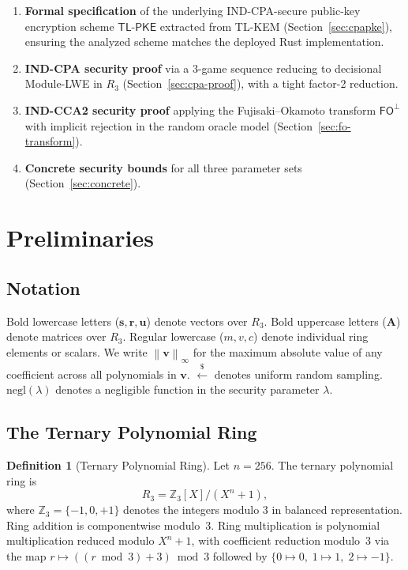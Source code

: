 \documentclass[11pt,a4paper]{article}
\theoremstyle{definition}
\newtheorem{definition}[theorem]{Definition}
\newcommand{\Z}{\mathbb{Z}}
\newcommand{\Rq}{R_3}
\newcommand{\linf}[1]{\left\lVert #1 \right\rVert_{\infty}}
\newcommand{\negl}{\mathrm{negl}}
\newcommand{\FO}{\textsf{FO}}
\newcommand{\CPAPKE}{\textsf{TL-PKE}}
\begin{document}
\begin{enumerate}[leftmargin=2em]
\item \textbf{Formal specification} of the underlying IND-CPA-secure public-key encryption scheme $\CPAPKE$ extracted from TL-KEM (Section~\ref{sec:cpapke}), ensuring the analyzed scheme matches the deployed Rust implementation.

\item \textbf{IND-CPA security proof} via a 3-game sequence reducing to decisional Module-LWE in $\Rq$ (Section~\ref{sec:cpa-proof}), with a tight factor-2 reduction.

\item \textbf{IND-CCA2 security proof} applying the Fujisaki--Okamoto transform $\FO^{\bot}$ with implicit rejection in the random oracle model (Section~\ref{sec:fo-transform}).

\item \textbf{Concrete security bounds} for all three parameter sets (Section~\ref{sec:concrete}).
\end{enumerate}

\section{Preliminaries}
\label{sec:prelim}

\subsection{Notation}

Bold lowercase letters ($\mathbf{s}, \mathbf{r}, \mathbf{u}$) denote vectors over $\Rq$. Bold uppercase letters ($\mathbf{A}$) denote matrices over $\Rq$. Regular lowercase ($m, v, c$) denote individual ring elements or scalars. We write $\linf{\mathbf{v}}$ for the maximum absolute value of any coefficient across all polynomials in $\mathbf{v}$. $\xleftarrow{\$}$ denotes uniform random sampling. $\negl(\lambda)$ denotes a negligible function in the security parameter $\lambda$.

\subsection{The Ternary Polynomial Ring}

\begin{definition}[Ternary Polynomial Ring]
\label{def:ring}
Let $n = 256$. The ternary polynomial ring is
\[
  \Rq = \Z_3[X] / (X^n + 1),
\]
where $\Z_3 = \{-1, 0, +1\}$ denotes the integers modulo 3 in balanced representation. Ring addition is componentwise modulo~3. Ring multiplication is polynomial multiplication reduced modulo $X^n + 1$, with coefficient reduction modulo~3 via the map $r \mapsto ((r \bmod 3) + 3) \bmod 3$ followed by $\{0 \mapsto 0,\; 1 \mapsto 1,\; 2 \mapsto -1\}$.
\end{definition}
\end{document}
